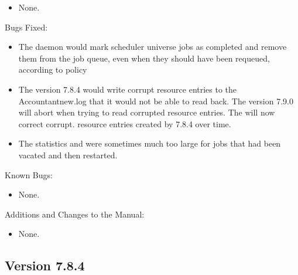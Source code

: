 \begin{itemize}

\item None.

\end{itemize}

\noindent Bugs Fixed:

\begin{itemize}

\item The  daemon would mark scheduler universe jobs
as completed and remove them from the job queue,
even when they should have been requeued, according to policy

\item The  version 7.8.4 would write corrupt resource entries
to the Accountantnew.log that it would not be able to read back.
The  version 7.9.0 will abort when trying to read
corrupted resource entries. The  will now correct corrupt.
resource entries created by 7.8.4 over time.

\item The  statistics 
and  were sometimes much too large for jobs
that had been vacated and then restarted.

\end{itemize}

\noindent Known Bugs:

\begin{itemize}

\item None.

\end{itemize}

\noindent Additions and Changes to the Manual:

\begin{itemize}

\item None.

\end{itemize}


\subsection*{\label{sec:New-7-8-4}Version 7.8.4}


